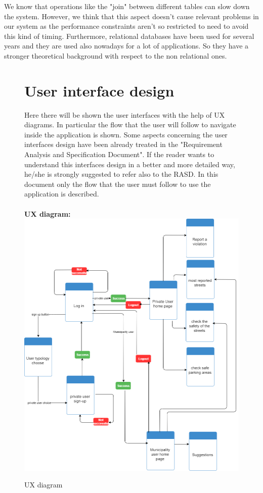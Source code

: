 \documentclass[titlepage]{article}
\begin{document}
\begin{itemize}
We know that operations like the "join" between different tables can slow down the system. However, we think that this aspect doesn't cause relevant problems in our system as the performance constraints aren't so restricted to need to avoid this kind of timing. Furthermore, relational databases have been used for several years and they are used also nowadays for a lot of applications. So they have a stronger theoretical background with respect to the non relational ones.
	
\end{itemize}

\begin{figure}[h]
	\section{User interface design}
Here there will be shown the user interfaces with the help of UX diagrams. In particular the flow that the user will follow to navigate inside the application is shown. Some aspects concerning the user interfaces design have been already treated in the "Requirement Analysis and Specification Document". If the reader wants to understand this interfaces design in a better and more detailed way, he/she is strongly suggested to refer also to the RASD. In this document only the flow that the user must follow to use the application is described. \\ \\
\textbf{UX diagram:\\}
	\includegraphics[scale=0.48]{Diagrams/UX diagram.png}
	\caption{UX diagram}
\end{figure}
\FloatBarrier
\end{document}
